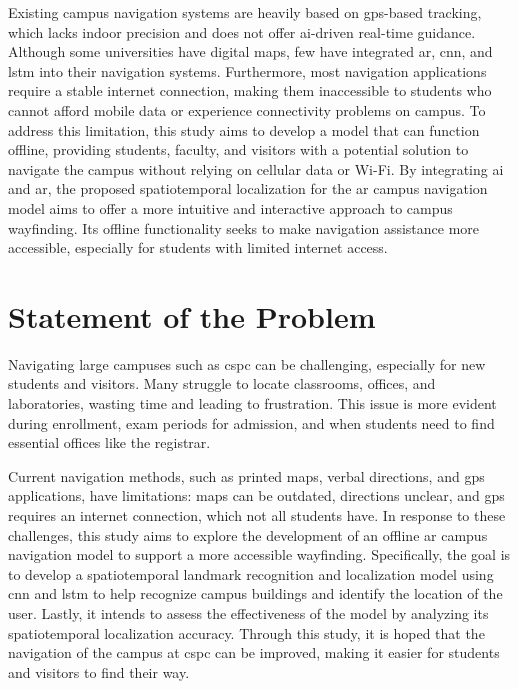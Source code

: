 \begin{refsection}
Existing campus navigation systems are heavily based on \gls{gps}-based tracking, which lacks indoor precision and does not offer \gls{ai}-driven real-time guidance. Although some universities have digital maps, few have integrated \gls{ar}, \gls{cnn}, and \gls{lstm} into their navigation systems. Furthermore, most navigation applications require a stable internet connection, making them inaccessible to students who cannot afford mobile data or experience connectivity problems on campus. To address this limitation, this study aims to develop a model that can function offline, providing students, faculty, and visitors with a potential solution to navigate the campus without relying on cellular data or Wi-Fi. By integrating \gls{ai} and \gls{ar}, the proposed spatiotemporal localization for the \gls{ar} campus navigation model aims to offer a more intuitive and interactive approach to campus wayfinding. Its offline functionality seeks to make navigation assistance more accessible, especially for students with limited internet access.

\section{Statement of the Problem}

Navigating large campuses such as \gls{cspc} can be challenging, especially for new students and visitors. Many struggle to locate classrooms, offices, and laboratories, wasting time and leading to frustration. This issue is more evident during enrollment, exam periods for admission, and when students need to find essential offices like the registrar.

Current navigation methods, such as printed maps, verbal directions, and \gls{gps} applications, have limitations: maps can be outdated, directions unclear, and \gls{gps} requires an internet connection, which not all students have. In response to these challenges, this study aims to explore the development of an offline \gls{ar} campus navigation model to support a more accessible wayfinding. Specifically, the goal is to develop a spatiotemporal landmark recognition and localization model using \gls{cnn} and \gls{lstm} to help recognize campus buildings and identify the location of the user. Lastly, it intends to assess the effectiveness of the model by analyzing its spatiotemporal localization accuracy. Through this study, it is hoped that the navigation of the campus at \gls{cspc} can be improved, making it easier for students and visitors to find their way.


\end{refsection}
